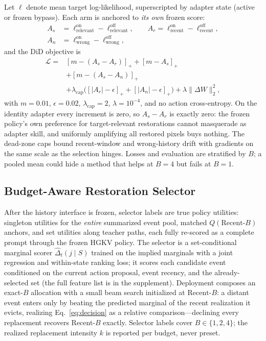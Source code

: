 \documentclass[letterpaper]{article} %
\newcommand{\hgkv}{\textsc{HGKV}}
\begin{document}
Let $\ell$ denote mean target log-likelihood, superscripted by adapter state
(active or frozen bypass). Each arm is anchored to \emph{its own} frozen
score:
\begin{equation}
\begin{aligned}
A_s&=\ell^{\mathrm{on}}_{\mathrm{relevant}}-\ell^{\mathrm{off}}_{\mathrm{relevant}},\qquad
A_r=\ell^{\mathrm{on}}_{\mathrm{recent}}-\ell^{\mathrm{off}}_{\mathrm{recent}},\\
A_n&=\ell^{\mathrm{on}}_{\mathrm{wrong}}-\ell^{\mathrm{off}}_{\mathrm{wrong}},
\end{aligned}
\end{equation}
and the DiD objective is
\begin{equation}
\begin{aligned}
\mathcal L ={}& [m-(A_s-A_r)]_+ + [m-A_s]_+ \\
&+ [m-(A_s-A_n)]_+ \\
&+ \lambda_{\mathrm{cap}}\bigl([|A_r|-\epsilon]_+ + [|A_n|-\epsilon]_+\bigr)
+ \lambda\lVert\Delta W\rVert_2^2,
\end{aligned}
\label{eq:did}
\end{equation}
with $m{=}0.01$, $\epsilon{=}0.02$, $\lambda_{\mathrm{cap}}{=}2$,
$\lambda{=}10^{-4}$, and no action cross-entropy. On the identity adapter
every increment is zero, so $A_s-A_r$ is exactly zero: the frozen policy's
own preference for target-relevant restorations cannot masquerade as adapter
skill, and uniformly amplifying all restored pixels buys nothing. The
dead-zone caps bound recent-window and wrong-history drift with gradients on
the same scale as the selection hinges. Losses and evaluation are stratified
by $B$; a pooled mean could hide a method that helps at $B{=}4$ but fails at
$B{=}1$.

\subsection{Budget-Aware Restoration Selector}

After the history interface is frozen, selector labels are true policy
utilities: singleton utilities for the \emph{entire} summarized event pool,
matched $Q(\mathrm{Recent}\text{-}B)$ anchors, and set utilities along
teacher paths, each fully re-scored as a complete prompt through the frozen
\hgkv{} policy. The selector is a set-conditional marginal scorer
$\widehat{\Delta}_t(j\mid S)$ trained on the implied marginals with a joint
regression and within-state ranking loss; it scores each candidate event
conditioned on the current action proposal, event recency, and the
already-selected set (the full feature list is in the supplement).
Deployment composes an exact-$B$ allocation with a small beam search
initialized at $\mathrm{Recent}\text{-}B$: a distant event enters only by
beating the predicted marginal of the recent realization it evicts,
realizing Eq.~\ref{eq:decision} as a relative comparison---declining every
replacement recovers Recent-$B$ exactly. Selector labels cover
$B\in\{1,2,4\}$; the realized replacement intensity $k$ is reported per
budget, never preset.
\end{document}
